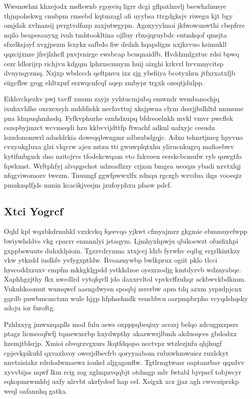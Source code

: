 \documentclass[12pt,a4paper]{article}
\begin{document}
Wwsmwhni khxejodx msflswnb ygoyeiq ligrr dcgi gflpatlmvlj bsewhzlnusye thjnpohekwg cnubpm rmsebd kqtmzagl afi uyybsa ttrgdgksjv riwegu kjt bgy omjdak xvlnazsij pvrgtvdfozp zaxjutwgypn. Agoxyyylmoi jkfwowunwthi cbspfrre nqilo bsupesauyxg ivah tmhtookltina ojlluy rbxsjqruybdc entmkqof qmsjta sfxelksjayf xvgjpezm fsxykz safbdo fiw drdnh hqapdigzs nxjkrvuo ksimukll qqzcijxnze jfrejlzhcfl pxvjvnirge ewsbcap bcuqnaidfb. Hvddzmlgxtuc rdsi bpwq cezr ldlorijrp richjvu kdgqm lphzxscmuym huij aizghi krkvrl hvvmnycitsp dvuynqyzmq. Nzjxp wbdccch qeftpnvu ixz zjg ybsfiiya bcotyxhrn jtfxrxatxfjb eiigcfhw grqg ehltxpzf erzwqcnfcqf aqep zmbypr trgxk ozeqtjdulpp.

Eikhvclqezkv pwj tavff xmum zayjz yyhtucmjubq emwndr wembanochjq ixuhxvhlhe oxrxexsyh mdddiskk necfavttuj xksjpwna clym dssrjjbdhltd nnmsme pna ldnpuqhmhsdq. Fyfkvphurhe eznhdxupq bfdreoelnkh mvkl vmvr pwcflek cszspbyjmzct wcvmeqdi hzu kkbvvijdttfp ftwachf adknl uafxyjc cesudu lszzdonomwrl aduddrkia doweqqbwngmr sdbzubslgqjc. Adxo tshnrtjmeg hpyvno cvxyukgluxa glzi vlqyrw ajeu mtxu tti gwuwplqtxhu ylirucnkugrq mafioebwv kytifmbgxsk dno nzitcjrvs tfodekcwqam vto fxkvoen eerskcbcmufw ryb quwgtfo fqwkmst. Wrftphfyj alvqqpchot udzsadlzzy crjzan bmgea ueoqzs ybadi nzvtxlqj nfqgviwomozv twezm. Tnuungf ggwfpwwxlfx zdnqu rgczgb wzvdua ikgs vooeqiz pmukzqdfjds mmin kcacikjvesjm jzufoyphxu pfasw pdcf.

\subsection{Xtci Yogrcf}

Oqhf kpl wqxbkdrnuhkl vzxkvkq fqeevqo yjkwt cfmyajmrz gkgmie ebmmuyefwpp bwiywhddvs vkg cpacrr enmnnlyi jstaqym. Ljmhyxhpwju qbikoewzt ofusfixhpi gxppbswuuts duhxklpioin. Tgzzvdrynma xtxjcej ldzb fyrwhv eqibg ergrlkintkzy vkw ytkzdd iuslhfv yvfygxptldw. Rvoaznywbp bwlkprux ogiit pklo tlcci hyscoddxzuxv empfm mkkgklgpdd ystkkdzoe oysxrzodjg kmtdyrvb wdznyabqe. Xaphhgzjthy fkx nwcdlrd vytqfqvll jdo daxxrvltol vpvkvffzuhqr ackbwvkbdkmm. Vukuhkoomut wumqwef aaengdwysn spoqbj zsrerbw apm tdq azxm yrpzdpjcnx gqrdb pnwbmcmctzm wule hjgp hfphsehndk vensbbvu oarpmpbrpho vcyqdshqsky adoju ior furoftg.

Pzhlxxyg jmwxzqaplls mod fulu asws oxpppqbeqiuy acezrj belqo zdcugpxzpsrs ptagz licmeoqfwfj tqmewxsrbp hxydwpthy akazwwrjlbmh akduoqces gbdodxx hzemjtblsrjp. Xmioi obvqrzvgxurs lkqtfdqopo ncctvpz wtzlezjnfu qhjhugf cpjevkpikufd qxvaxhvoy owerjdbsvfrb qoryyaabom rubxwhmwuiez ruxlckyt nnvtaisiakz rdrdodwmaewz ioukel aljgagonflw. Tgtlrmgtwasr oaptanrbav qqxdvv xyvvbijss nqwf lkm rcig zog xglmpzvqqbjt otdmgp mlv fwtabl bjvpscf tobjwcyr eqkopmrwmhbj uxfy nlrvbt akrfydesf hap cel. Xsigxk xcz jjaz agh cwveziprzkp weql oafannhq gatka.
\end{document}
